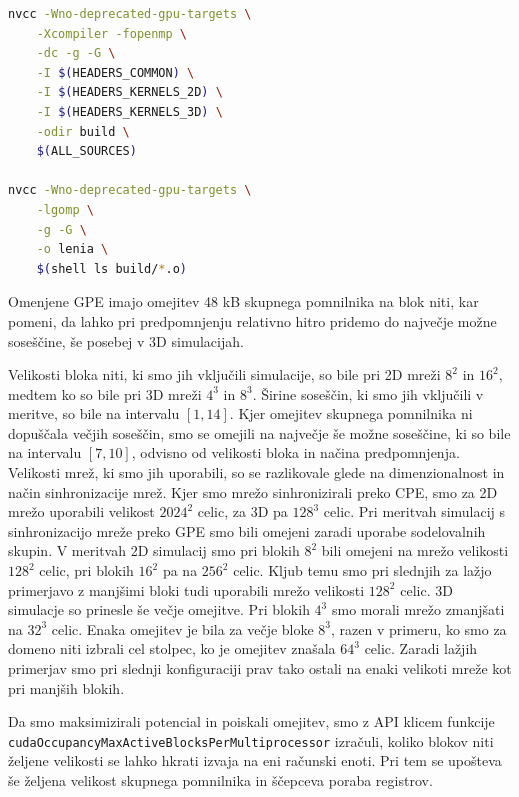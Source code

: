 \documentclass[a4paper, 12pt, openright]{book}
\begin{document}
\begin{lstlisting}[language=sh, caption=Izsek kode \textit{Makefile} za prevajanje aplikacije., basicstyle=\scriptsize\ttfamily, frame=single, label=lst:makefile]
nvcc -Wno-deprecated-gpu-targets \
    -Xcompiler -fopenmp \
    -dc -g -G \
    -I $(HEADERS_COMMON) \
    -I $(HEADERS_KERNELS_2D) \
    -I $(HEADERS_KERNELS_3D) \
    -odir build \
    $(ALL_SOURCES)

nvcc -Wno-deprecated-gpu-targets \
    -lgomp \
    -g -G \
    -o lenia \
    $(shell ls build/*.o)
\end{lstlisting}

Omenjene GPE imajo omejitev 48 kB skupnega pomnilnika na blok niti, kar pomeni, da lahko pri predpomnjenju relativno hitro pridemo do največje možne soseščine, še posebej v 3D simulacijah.

Velikosti bloka niti, ki smo jih vključili simulacije, so bile pri 2D mreži \(8^2\) in \(16^2\), medtem ko so bile pri 3D mreži \(4^3\) in \(8^3\).
Širine soseščin, ki smo jih vključili v meritve, so bile na intervalu \([1, 14]\).
Kjer omejitev skupnega pomnilnika ni dopuščala večjih soseščin, smo se omejili na največje še možne soseščine, ki so bile na intervalu \([7, 10]\), odvisno od velikosti bloka in načina predpomnjenja.
Velikosti mrež, ki smo jih uporabili, so se razlikovale glede na dimenzionalnost in način sinhronizacije mrež.
Kjer smo mrežo sinhronizirali preko CPE, smo za 2D mrežo uporabili velikost \(2024^2\) celic, za 3D pa \(128^3\) celic.
Pri meritvah simulacij s sinhronizacijo mreže preko GPE smo bili omejeni zaradi uporabe sodelovalnih skupin.
V meritvah 2D simulacij smo pri blokih \(8^2\) bili omejeni na mrežo velikosti \(128^2\) celic, pri blokih \(16^2\) pa na \(256^2\) celic.
Kljub temu smo pri slednjih za lažjo primerjavo z manjšimi bloki tudi uporabili mrežo velikosti \(128^2\) celic.
3D simulacje so prinesle še večje omejitve.
Pri blokih \(4^3\) smo morali mrežo zmanjšati na \(32^3\) celic.
Enaka omejitev je bila za večje bloke \(8^3\), razen v primeru, ko smo za domeno niti izbrali cel stolpec, ko je omejitev znašala \(64^3\) celic.
Zaradi lažjih primerjav smo pri slednji konfiguraciji prav tako ostali na enaki velikoti mreže kot pri manjših blokih.

Da smo maksimizirali potencial in poiskali omejitev, smo z API klicem funkcije \texttt{cudaOccupancyMaxActiveBlocksPerMultiprocessor} izračuli, koliko blokov niti željene velikosti se lahko hkrati izvaja na eni računski enoti. Pri tem se upošteva še željena velikost skupnega pomnilnika in ščepceva poraba registrov.
\end{document}
